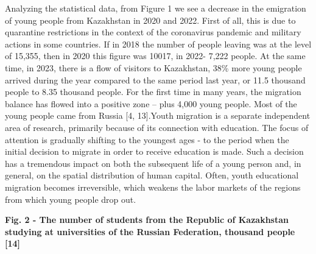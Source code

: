 \begin{multicols}{2}
Analyzing the statistical data, from Figure 1 we see a decrease in the
emigration of young people from Kazakhstan in 2020 and 2022. First of
all, this is due to quarantine restrictions in the context of the
coronavirus pandemic and military actions in some countries. If in 2018
the number of people leaving was at the level of 15,355, then in 2020
this figure was 10017, in 2022- 7,222 people. At the same time, in 2023,
there is a flow of visitors to Kazakhstan, 38\% more young people
arrived during the year compared to the same period last year, or 11.5
thousand people to 8.35 thousand people. For the first time in many
years, the migration balance has flowed into a positive zone -- plus
4,000 young people. Most of the young people came from Russia {[}4,
13{]}.Youth migration is a separate independent area of research,
primarily because of its connection with education. The focus of
attention is gradually shifting to the youngest ages - to the period
when the initial decision to migrate in order to receive education is
made. Such a decision has a tremendous impact on both the subsequent
life of a young person and, in general, on the spatial distribution of
human capital. Often, youth educational migration becomes irreversible,
which weakens the labor markets of the regions from which young people
drop out.
\end{multicols}

{\bfseries Fig. 2 - The number of students from the Republic of Kazakhstan
studying at universities of the Russian Federation, thousand people
{[}14{]}}

